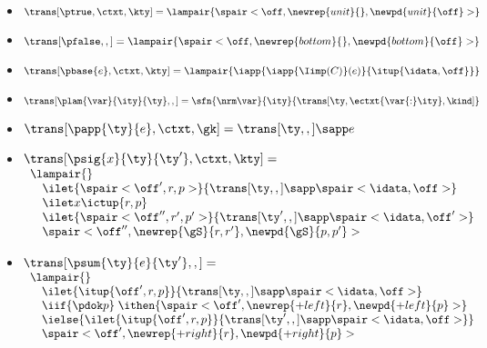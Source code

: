 \begin{figure}
\small
{} 

\begin{itemize}
\renewcommand{\labelitemi}{}
\item $\trans[\ptrue,\ctxt,\kty] =
  \lampair{\spair<\off,\newrep{unit}{},\newpd{unit}{\off}>}$

\item $\trans[\pfalse,,] =
  \lampair{\spair<\off,\newrep {bottom}{},\newpd {bottom}{\off}>}$

\item $\trans[\pbase{e},\ctxt,\kty] =
  \lampair{\iapp {\iapp {\Iimp(C)} (e)} {\itup {\idata,\off}}}$

\item $\trans[\plam{\var}{\ity}{\ty},,] =
   \sfn{\nrm\var}{\ity}{\trans[\ty,\ectxt{\var{:}\ity},\kind]}$

\item $\trans[\papp{\ty}{e},\ctxt,\gk] =
  \trans[\ty,,] \sapp e$

\item $\trans[\psig{x}{\ty}{\ty'},\ctxt,\kty] =$ \\
  $\begin{array}{l}  
    \lampair{} \\
    \quad  \ilet {\spair<\off',r,p>} 
    {{\trans[\ty,,]} \sapp \spair<\idata,\off>} \\
    \quad  \ilet x {\ictup{r,p}}\\
    \quad  \ilet {\spair<\off'',r',p'>} 
    {{\trans[\ty',,]} \sapp \spair<\idata,\off'>} \\
    \quad \spair<\off'',\newrep {\gS}{r,r'},\newpd {\gS}{p,p'}>
  \end{array}$

\item $\trans[\psum{\ty}{e}{\ty'},,] =$ \\
  $\begin{array}{l}  
  \lampair{} \\
  \quad \ilet {\itup{\off',r,p}}{\trans[\ty,,] \sapp \spair<\idata,\off>} \\
  \quad \iif {\pdok p} \; \ithen {
    \def \r {\newrep {+left}{r}}
    \def \p {\newpd {+left}{p}}
    \spair<\off',\r,\p>} \\
  \quad \ielse {\ilet {\itup{\off',r,p}}{\trans[\ty',,] \sapp \spair<\idata,\off>}} \\
  \quad 
  {  %
    \def \r {\newrep {+right}{r}}
    \def \p {\newpd {+right}{p}}
    \spair<\off',\r,\p>
  }\\ %
  \end{array}$


\end{itemize}
\end{figure}
